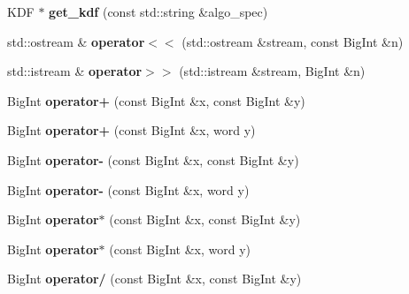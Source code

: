\begin{DoxyCompactItemize}
\item 
\mbox{\label{namespace_botan_a95618c8fe8fd211f5a92853007228bc7}} 
K\+DF $\ast$ {\bfseries get\+\_\+kdf} (const std\+::string \&algo\+\_\+spec)
\item 
\mbox{\label{namespace_botan_a6229f0096f2241baaddf1b905077c4e0}} 
std\+::ostream \& {\bfseries operator$<$$<$} (std\+::ostream \&stream, const Big\+Int \&n)
\item 
\mbox{\label{namespace_botan_ae33d22bc29cd11c4edfa5ba1ff05895b}} 
std\+::istream \& {\bfseries operator$>$$>$} (std\+::istream \&stream, Big\+Int \&n)
\item 
\mbox{\label{namespace_botan_a9e32cc5fc8e75531b11c6e6f51310d83}} 
Big\+Int {\bfseries operator+} (const Big\+Int \&x, const Big\+Int \&y)
\item 
\mbox{\label{namespace_botan_a37adccc7857d4594e403bf41c5a8476d}} 
Big\+Int {\bfseries operator+} (const Big\+Int \&x, word y)
\item 
\mbox{\label{namespace_botan_a66643ed3bed15c00235afd74dc52f674}} 
Big\+Int {\bfseries operator-\/} (const Big\+Int \&x, const Big\+Int \&y)
\item 
\mbox{\label{namespace_botan_a19d38462775851d306e1381ccf3468c9}} 
Big\+Int {\bfseries operator-\/} (const Big\+Int \&x, word y)
\item 
\mbox{\label{namespace_botan_a2517208e22a450179542421e18fb22ae}} 
Big\+Int {\bfseries operator$\ast$} (const Big\+Int \&x, const Big\+Int \&y)
\item 
\mbox{\label{namespace_botan_aeadad0f30765384d067cd7fedb9cfb8c}} 
Big\+Int {\bfseries operator$\ast$} (const Big\+Int \&x, word y)
\item 
\mbox{\label{namespace_botan_a58016166908e4a05f874f81447c2afde}} 
Big\+Int {\bfseries operator/} (const Big\+Int \&x, const Big\+Int \&y)
\item 
\mbox{\label{namespace_botan_a5b1b142817836cb6fd85c1b551542fab}} 

\end{DoxyCompactItemize}

